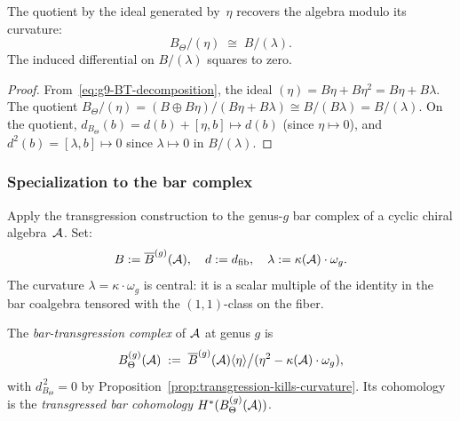 \begin{proposition}
\label{prop:g9-quotient}
The quotient by the ideal generated by~$\eta$ recovers the algebra
modulo its curvature:
\begin{equation}\label{eq:g9-quotient-id}
B_\Theta / (\eta) \;\cong\; B / (\lambda).
\end{equation}
The induced differential on $B/(\lambda)$ squares to zero.
\end{proposition}

\begin{proof}
From~\eqref{eq:g9-BT-decomposition}, the ideal $(\eta) = B\eta + B\eta^2
= B\eta + B\lambda$. The quotient
$B_\Theta/(\eta) = (B \oplus B\eta)/(B\eta + B\lambda)
\cong B/(B\lambda) = B/(\lambda)$.
On the quotient, $d_{B_\Theta}(b) = d(b) + [\eta, b] \mapsto d(b)$
(since $\eta \mapsto 0$), and $d^2(b) = [\lambda, b] \mapsto 0$ since
$\lambda \mapsto 0$ in $B/(\lambda)$.
\end{proof}

\subsubsection{Specialization to the bar complex}
\label{subsubsec:transgression-bar}

Apply the transgression construction to the genus-$g$ bar complex of a
cyclic chiral algebra~$\mathcal{A}$. Set:
\begin{equation}\label{eq:g9-specialization}
B := \overline{B}^{(g)}(\mathcal{A}),
\quad
d := d_{\mathrm{fib}},
\quad
\lambda := \kappa(\mathcal{A}) \cdot \omega_g.
\end{equation}
The curvature $\lambda = \kappa \cdot \omega_g$ is central: it is a scalar
multiple of the identity in the bar coalgebra tensored with the
$(1,1)$-class on the fiber.

\begin{definition}
\label{def:bar-transgression-complex}
The \emph{bar-transgression complex} of $\mathcal{A}$ at genus $g$ is
\begin{equation}\label{eq:g9-bar-transgression}
B_\Theta^{(g)}(\mathcal{A})
\;:=\;
\overline{B}^{(g)}(\mathcal{A})\langle \eta \rangle
\big/ (\eta^2 - \kappa(\mathcal{A}) \cdot \omega_g),
\end{equation}
with $d_{B_\Theta}^{\,2} = 0$ by
Proposition~\ref{prop:transgression-kills-curvature}.
Its cohomology is the \emph{transgressed bar cohomology}
$H^*(B_\Theta^{(g)}(\mathcal{A}))$.
\end{definition}


